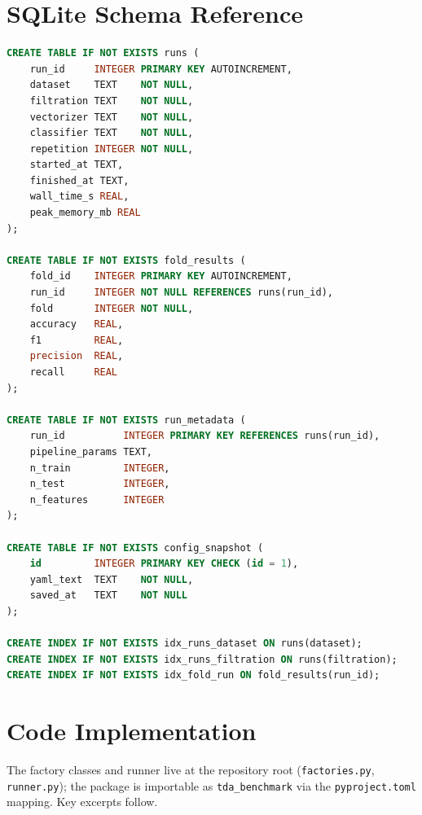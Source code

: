 \documentclass[12pt, a4paper]{report}
\theoremstyle{definition}
\theoremstyle{plain}
\theoremstyle{remark}
\begin{document}
\newpage

\chapter{SQLite Schema Reference}
\label{app:schema}

\begin{lstlisting}[language=SQL, morekeywords={REFERENCES}, basicstyle=\ttfamily\footnotesize, columns=fullflexible, breaklines]
CREATE TABLE IF NOT EXISTS runs (
    run_id     INTEGER PRIMARY KEY AUTOINCREMENT,
    dataset    TEXT    NOT NULL,
    filtration TEXT    NOT NULL,
    vectorizer TEXT    NOT NULL,
    classifier TEXT    NOT NULL,
    repetition INTEGER NOT NULL,
    started_at TEXT,
    finished_at TEXT,
    wall_time_s REAL,
    peak_memory_mb REAL
);

CREATE TABLE IF NOT EXISTS fold_results (
    fold_id    INTEGER PRIMARY KEY AUTOINCREMENT,
    run_id     INTEGER NOT NULL REFERENCES runs(run_id),
    fold       INTEGER NOT NULL,
    accuracy   REAL,
    f1         REAL,
    precision  REAL,
    recall     REAL
);

CREATE TABLE IF NOT EXISTS run_metadata (
    run_id          INTEGER PRIMARY KEY REFERENCES runs(run_id),
    pipeline_params TEXT,
    n_train         INTEGER,
    n_test          INTEGER,
    n_features      INTEGER
);

CREATE TABLE IF NOT EXISTS config_snapshot (
    id         INTEGER PRIMARY KEY CHECK (id = 1),
    yaml_text  TEXT    NOT NULL,
    saved_at   TEXT    NOT NULL
);

CREATE INDEX IF NOT EXISTS idx_runs_dataset ON runs(dataset);
CREATE INDEX IF NOT EXISTS idx_runs_filtration ON runs(filtration);
CREATE INDEX IF NOT EXISTS idx_fold_run ON fold_results(run_id);
\end{lstlisting}

\newpage

\chapter{Code Implementation}
\label{app:code}

The factory classes and runner live at the repository root
(\texttt{factories.py}, \texttt{runner.py}); the package is importable
as \texttt{tda\_benchmark} via the \texttt{pyproject.toml} mapping.
Key excerpts follow.
\end{document}
